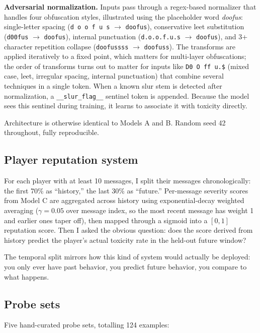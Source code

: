\documentclass[11pt,twocolumn,letterpaper]{article}
\begin{document}
\textbf{Adversarial normalization.} Inputs pass through a regex-based normalizer that handles four obfuscation styles, illustrated using the placeholder word \textit{doofus}: single-letter spacing (\texttt{d o o f u s} $\to$ \texttt{doofus}), conservative leet substitution (\texttt{d00fus} $\to$ \texttt{doofus}), internal punctuation (\texttt{d.o.o.f.u.s} $\to$ \texttt{doofus}), and 3+ character repetition collapse (\texttt{doofussss} $\to$ \texttt{doofuss}). The transforms are applied iteratively to a fixed point, which matters for multi-layer obfuscations; the order of transforms turns out to matter for inputs like \texttt{D0 O ff u.\$} (mixed case, leet, irregular spacing, internal punctuation) that combine several techniques in a single token. When a known slur stem is detected after normalization, a \texttt{\_\_slur\_flag\_\_} sentinel token is appended. Because the model sees this sentinel during training, it learns to associate it with toxicity directly.

Architecture is otherwise identical to Models A and B. Random seed 42 throughout, fully reproducible.

\subsection{Player reputation system}

For each player with at least 10 messages, I split their messages chronologically: the first 70\% as ``history,'' the last 30\% as ``future.'' Per-message severity scores from Model C are aggregated across history using exponential-decay weighted averaging ($\gamma = 0.05$ over message index, so the most recent message has weight 1 and earlier ones taper off), then mapped through a sigmoid into a $[0, 1]$ reputation score. Then I asked the obvious question: does the score derived from history predict the player's actual toxicity rate in the held-out future window?

The temporal split mirrors how this kind of system would actually be deployed: you only ever have past behavior, you predict future behavior, you compare to what happens.

\subsection{Probe sets}

Five hand-curated probe sets, totalling 124 examples:
\end{document}
